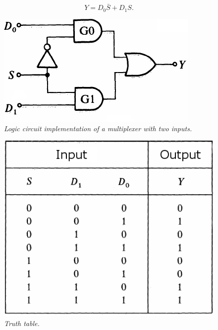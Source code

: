 \begin{equation}
Y=D_0\bar S+D_1S.
\label{eq1}
\end{equation}
\begin{figure}[!h]
	\centering
	\includegraphics[scale=0.6]{immagini/mux_1.png}
	\caption{\textit{Logic circuit implementation of a multiplexer with two inputs.}} 
	\label{mux_1}
\end{figure}

\begin{figure}[!h]
	\centering
	\includegraphics[scale=0.4]{immagini/mux_fun1.png}
	\caption{\textit{Truth table.}} 
	\label{mux_funz}
\end{figure}
\newpage
